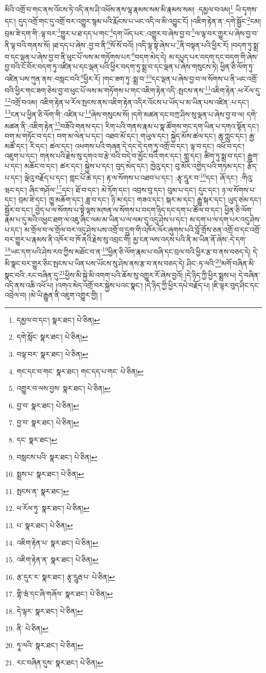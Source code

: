 མིའི་འགྲོ་བ་གང་ནས་འོངས་ཏེ་འདི་ནས་ཤི་འཕོས་ནས་ལྷ་རྣམས་སམ་མི་རྣམས་སམ། :དམྱལ་བའམ།\footnote{དམྱལ་བ་དང་།  སྣར་ཐང་།  པེ་ཅིན། } ཡི་དྭགས་དང་། དུད་འགྲོ་གང་དུ་འགྲོ་བར་འགྱུར་སྙམ་པའི་རྨོངས་པ་ཡང་འདི་ལ་མི་འབྱུང་ངོ། །འཇིག་རྟེན་ན་:དགེ་སྦྱོང་\footnote{དགེ་སློང་  སྣར་ཐང་།  པེ་ཅིན། }ངམ། བྲམ་ཟེ་དག་གི་:ལྟ་བར་\footnote{བལྟ་བར་  སྣར་ཐང་།  པེ་ཅིན། }གྱུར་པ་ཐ་དད་པ་གང་\footnote{གང་དང་བ་གང་  སྣར་ཐང་། གང་དད་པ་གང་  པེ་ཅིན། }དག་ཡོད་པར་:འགྱུར་བ་ཞེས་བྱ་བ་\footnote{འགྱུར་བ་ལས་བྱས་  སྣར་ཐང་།  པེ་ཅིན། }ལ་ལྟ་བར་གྱུར་པ་ཞེས་བྱ་བ་ནི་ལྟ་བའི་གནས་སོ། །ཐ་དད་པ་ཞེས་:བྱ་བ་ནི་\footnote{བྱ་བ་  སྣར་ཐང་།  པེ་ཅིན། }སོ་སོ་བའོ། །འདི་ལྟ་སྟེ་ཞེས་པ་\footnote{བྱ་བ་  སྣར་ཐང་།  པེ་ཅིན། }ནི་བསྟན་པའི་ཕྱིར་རོ། །བདག་ཏུ་སྨྲ་བ་དང་ལྡན་པ་ཞེས་བྱ་བ་ནི་ཕུང་པོ་ལས་མ་གཏོགས་པར་\footnote{དང་  སྣར་ཐང་། }བདག་མེད་དེ། མ་དཔྱད་པར་བདག་དང་བདག་གི་ཞེས་བྱ་བའི་ངོ་བོར་བདག་ཏུ་འཛིན་པ་དང་ལྡན་པའི་ཕྱིར་བདག་ཏུ་སྨྲ་བ་དང་ལྡན་པ་ཞེས་གསུངས་ཏེ། ཕྱིན་ཅི་ལོག་ཏུ་འཛིན་པས་ཀུན་ནས་:བསླང་བའི་\footnote{བསླངས་པའི་  སྣར་ཐང་།  པེ་ཅིན། }ཕྱིར་རོ། །གང་ཟག་ཏུ་:སྨྲ་བ་\footnote{སྨྲས་པ་  སྣར་ཐང་།  པེ་ཅིན། }དང་ལྡན་པ་ཞེས་བྱ་བ་ལ་སོགས་པ་ནི་ཡང་འགྲོ་བའི་ཕྱིར་གང་ཟག་ཅེས་བྱ་བ་ཕུང་པོ་ལས་མ་གཏོགས་པ་གང་འཇིག་རྟེན་འདི་:སྤངས་ནས་\footnote{སྤངས་ན་  སྣར་ཐང་། }འཇིག་རྟེན་:ཕ་རོལ་དུ་\footnote{ཕ་རོལ་ཏུ་  སྣར་ཐང་།  པེ་ཅིན། }འགྲོ་བའམ། འཇིག་རྟེན་ཕ་རོལ་སྤངས་ནས་འཇིག་རྟེན་འདིར་འོངས་པ་ཡོད་པ་མ་ཡིན་པས་འཛིན་:པ་དང་། \footnote{པ་  སྣར་ཐང་།  པེ་ཅིན། }ངན་པ་ཕྱིན་ཅི་ལོག་གི་:འཛིན་པ་\footnote{འཇིག་རྟེན་པ་  སྣར་ཐང་།  པེ་ཅིན། }ཞེས་གསུངས་སོ། །དགེ་མཚན་དང་བཀྲ་ཤིས་སུ་ལྡན་པ་ཞེས་བྱ་བ་ལ། དགེ་མཚན་ནི་:འཇིག་རྟེན་\footnote{འཇིག་རྟེན་ན་  སྣར་ཐང་།  པེ་ཅིན། }བཟོའི་གནས་དང་། རིག་པའི་གནས་རྣམ་པ་སྣ་ཚོགས་གང་དག་ཡིན་པ་དགའ་སྟོན་དང་། བག་མ་གཏོང་བ་དང་། བག་མ་ལེན་པ་དང་། འཐབ་མོ་དང་། གཡུལ་དང་། སྐྱེད་མོས་ཚལ་དང་། ཆུ་ཀླུང་དང་། རྒྱ་མཚོ་དང་། རི་དང་། ཚལ་དང་། འཕགས་པའི་གཞན་དེ་དང་དེ་དག་ཏུ་འགྲོ་བ་དང་། ལྟ་བ་དང་། འཕོ་བ་དང་། འཇུག་པ་དང་། གནས་པའི་རྗེས་སུ་དགའ་བ་རྩེ་བའི་བདེ་བ་མྱོང་བའི་གར་དང་། གླུ་དང་། ཚིག་ཏུ་སྨྲ་བ་དང་། རྒྱུག་པ་དང་། མཆོང་བ་དང་། ཚར་དང་། སྐྱེས་པ་དང་། བུད་མེད་དང་། ཁྱེའུ་དང་། བུ་མོར་འགྱེད་པའི་གཏམ་དང་། རྩོད་པ་དང་། ལྡེའུ་བརྗོད་པ་དང་། གླང་པོ་ཆེ་དང་། རྟ་ལ་སོགས་པ་འཐབ་པ་དང་། :རྩྭ་དཱུར་བ་\footnote{རྩ་དུར་ར་  སྣར་ཐང་། རྩྭ་དཱུརྦ་པ་  པེ་ཅིན། }དང་། ཞོ་དང་། :གིའུ་ཝང་དང་། ཞིང་གཤོལ་\footnote{གྷི་ཝཾ་དང་ཞི་གཞོལ་  སྣར་ཐང་།  པེ་ཅིན། }དང་། ཐོ་བ་དང་། མེ་ཏོག་དང་། འབྲས་བུ་དང་། བུམ་པ་དང་། དུང་དང་། ཉ་ལ་སོགས་པ་དང་། བྲམ་ཟེ་དང་། ཁྱུ་མཆོག་དང་། ཟླ་བ་དང་། ཉི་མ་དང་། གཟའ་དང་། སྐར་མ་དང་། རྒྱུ་སྐར་དང་། ཡུད་ཙམ་དང་། སྦྱོར་བ་དང་། བྱེད་པ་ལ་སོགས་པ་སྟེ་ལྟས་མཁན་ལ་སོགས་པ་བདག་ཉིད་དང་དག་པ་ཚོལ་བ་དང་། ཕྱིན་ཅི་ལོག་རྣམ་པ་དུ་མའི་འཕྱང་ཐག་ལ་འཇུ་ཞིང་ལམ་མ་ཡིན་པ་ལ་ལམ་དུ་འདུ་ཤེས་པ་དང་། མ་དག་པ་ལ་དག་པར་འདུ་ཤེས་པ་དང་། མ་གྲོལ་བ་ལ་གྲོལ་བར་འདུ་ཤེས་པས་འགྲོ་བ་དྲུག་གི་འཁོར་ལོར་ཞུགས་པའི་བློ་གྲོས་ཅན་འགྲོ་བ་དང་འགྲོ་བར་གྱུར་པ་རྣམས་ནི་འཁོར་བ་ཁོ་ནའི་རྗེས་སུ་འབྲང་གི། མྱ་ངན་ལས་འདས་པའི་ནི་མ་ཡིན་ནོ་ཞེས་:དེ་དག་\footnote{དེ་ལྟར་  སྣར་ཐང་།  པེ་ཅིན། }ཡང་དག་པའི་ཤེས་རབ་ཀྱིས་མཐོང་བ་ན་\footnote{ནི་  པེ་ཅིན། }ཕྱིན་ཅི་ལོག་རྣམ་པ་བཞི་དང་བྲལ་བའི་ཕྱིར་རྩ་བ་ནས་བཅད་དེ། དེ་མི་སྣང་བར་གྱུར་ཅིང་སྤངས་པ་ཡིན་པས་ཡོངས་སུ་ཤེས་ནས་རྩ་བ་ནས་བཅད་དེ། ཤིང་:ཏ་ལའི་\footnote{ཏཱ་ལའི་  སྣར་ཐང་།  པེ་ཅིན། }མགོ་བཞིན་མི་སྣང་བའི་:རང་བཞིན་དུ་\footnote{རང་བཞིན་དུས་  སྣར་ཐང་།  པེ་ཅིན། }ཕྱིས་མི་སྐྱེ་མི་འགག་པའི་ཆོས་སུ་འགྱུར་རོ་ཞེས་བྱའོ། །དེ་ཉིད་ཀྱི་ཕྱིར་སྨྲས་པ། དེ་བཞིན་འདི་ནས་འཆི་འཕོ་པ། །འགའ་མེད་འགྲོ་བར་སྐྱེས་པའང་སྣང་། །དེ་ཉིད་ཀྱི་ཕྱིར་དཔེ་བརྗོད་པ། །ཇི་ལྟར་བུད་ཤིང་དང་འབྲེལ་བ། །མེ་ཡི་རྒྱུན་ནི་འཇུག་འགྱུར་གྱི། །
